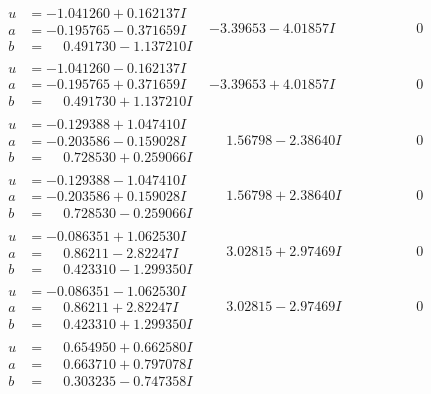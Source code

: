 \documentclass[1p]{elsarticle_modified}
\theoremstyle{definition}
\begin{document}
$$\begin{array}{c|c|c}
\begin{aligned}
u &= -1.041260 + 0.162137 I \\
a &= -0.195765 - 0.371659 I \\
b &= \phantom{-}0.491730 - 1.137210 I\end{aligned}
 & -3.39653 - 4.01857 I & \phantom{-0.000000 } 0 \\ \hline\begin{aligned}
u &= -1.041260 - 0.162137 I \\
a &= -0.195765 + 0.371659 I \\
b &= \phantom{-}0.491730 + 1.137210 I\end{aligned}
 & -3.39653 + 4.01857 I & \phantom{-0.000000 } 0 \\ \hline\begin{aligned}
u &= -0.129388 + 1.047410 I \\
a &= -0.203586 - 0.159028 I \\
b &= \phantom{-}0.728530 + 0.259066 I\end{aligned}
 & \phantom{-}1.56798 - 2.38640 I & \phantom{-0.000000 } 0 \\ \hline\begin{aligned}
u &= -0.129388 - 1.047410 I \\
a &= -0.203586 + 0.159028 I \\
b &= \phantom{-}0.728530 - 0.259066 I\end{aligned}
 & \phantom{-}1.56798 + 2.38640 I & \phantom{-0.000000 } 0 \\ \hline\begin{aligned}
u &= -0.086351 + 1.062530 I \\
a &= \phantom{-}0.86211 - 2.82247 I \\
b &= \phantom{-}0.423310 - 1.299350 I\end{aligned}
 & \phantom{-}3.02815 + 2.97469 I & \phantom{-0.000000 } 0 \\ \hline\begin{aligned}
u &= -0.086351 - 1.062530 I \\
a &= \phantom{-}0.86211 + 2.82247 I \\
b &= \phantom{-}0.423310 + 1.299350 I\end{aligned}
 & \phantom{-}3.02815 - 2.97469 I & \phantom{-0.000000 } 0 \\ \hline\begin{aligned}
u &= \phantom{-}0.654950 + 0.662580 I \\
a &= \phantom{-}0.663710 + 0.797078 I \\
b &= \phantom{-}0.303235 - 0.747358 I\end{aligned}

\end{array}$$
\end{document}
